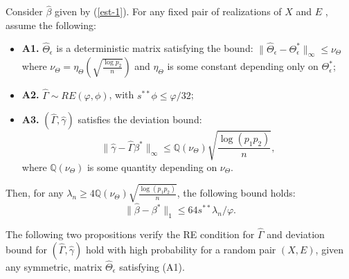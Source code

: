 

% 
%
%
%

\begin{theorem} \label{thm:ErrorBound_beta}
Consider $\widehat{\beta}$ given by (\ref{est-1}). For any fixed pair of realizations of $X$ and $E$ , assume the following:
\begin{itemize}
\item[] \textbf{A1.} $\widehat{\Theta}_\epsilon$ is a deterministic matrix satisfying the bound: $\|\widehat{\Theta}_\epsilon-\Theta_\epsilon^*\|_\infty\leq\nu_\Theta$ where $\nu_\Theta= \eta_\Theta\left(\sqrt{\frac{\log p_2}{n}}\right)$ and $\eta_\Theta$ is some constant depending only on $\Theta_\epsilon^*$;
\item[] \textbf{A2.} $\widehat{\Gamma}\sim RE(\varphi,\phi)$, with $s^{**}\phi\leq \varphi/32$;
\item[] \textbf{A3.} $(\widehat{\Gamma},\widehat{\gamma})$ satisfies the deviation bound:
\begin{equation*}
\|\widehat{\gamma}-\widehat{\Gamma}\beta^*\|_\infty \leq \mathbb{Q}({\nu_\Theta})\sqrt{\frac{\log(p_1p_2)}{n}},
\end{equation*}
where $\mathbb{Q}({\nu_\Theta})$ is some quantity depending on $\nu_\Theta$. 
\end{itemize}
Then, for any $\lambda_n\geq 4\mathbb{Q}(\nu_\Theta)\sqrt{\frac{\log(p_1p_2)}{n}}$, the following bound holds:
\begin{equation*}
\|\widehat{\beta}-\beta^*\|_1 \leq 64s^{**}\lambda_n/\varphi. 
\end{equation*}
\end{theorem}

The following two propositions verify the RE condition for $\widehat{\Gamma}$ and deviation bound for $(\widehat{\Gamma},\widehat{\gamma})$ hold with high probability for a random pair $(X,E)$, given any symmetric, matrix $\widehat{\Theta}_\epsilon$ satisfying (A1). 


%
%
%
%


